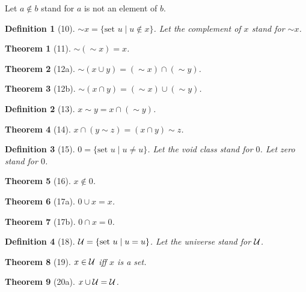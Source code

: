 \documentclass{scrartcl}
\newenvironment{forthel}{\begin{leftbar}}{\end{leftbar}}
\newtheorem*{theorem}{Theorem}
\newtheorem*{definition}{Definition}
\begin{document}
\begin{forthel}
Let $a \notin b$ stand for $a$ is not an element of $b$.

\begin{definition}[10] $\sim x = \{\text{set } u \mid u \notin x\}$.
Let the \emph{complement} of $x$ stand for $\sim x$.
\end{definition}

\begin{theorem}[11] $\sim (\sim x) = x$.
\end{theorem}

\begin{theorem}[12a] $\sim (x \cup y) = (\sim x) \cap (\sim y)$.
\end{theorem}

\begin{theorem}[12b] $\sim (x \cap y) = (\sim x) \cup (\sim y)$.
\end{theorem}

\begin{definition}[13] $x \sim y = x \cap (\sim y)$.
\end{definition}

\begin{theorem}[14] $x \cap (y \sim z) = (x \cap y) \sim z$.
\end{theorem}

\begin{definition}[15] $0 = \{\text{set } u \mid u \neq u\}$.
Let the \emph{void class} stand for $0$.
Let \emph{zero} stand for $0$.
\end{definition}

\begin{theorem}[16] $x \notin 0$.
\end{theorem}

\begin{theorem}[17a] $0 \cup x = x$.
\end{theorem}

\begin{theorem}[17b] $0 \cap x = 0$.
\end{theorem}

\begin{definition}[18] ${\cal U} = \{\text{set } u \mid u = u\}$.
Let the \emph{universe} stand for ${\cal U}$.
\end{definition}

\begin{theorem}[19] $x \in {\cal U}$ iff $x$ is a set.
\end{theorem}

\begin{theorem}[20a] $x \cup {\cal U} = {\cal U}$.
\end{theorem}


\end{forthel}
\end{document}
